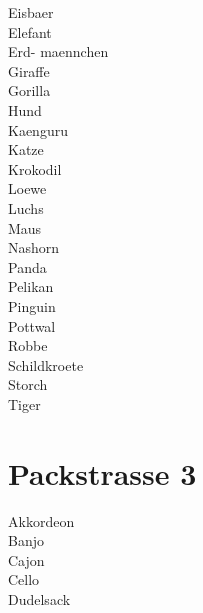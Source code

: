 \documentclass{article}
\begin{document}
Eisbaer
\\


Elefant
\\


Erd-
maennchen
\\


Giraffe
\\


Gorilla
\\


Hund
\\


Kaenguru
\\


Katze
\\


Krokodil
\\


Loewe
\\


Luchs
\\


Maus
\\


Nashorn
\\


Panda
\\


Pelikan
\\


Pinguin
\\


Pottwal
\\


Robbe
\\


Schildkroete
\\


Storch
\\


Tiger
\\

\newpage
\section{Packstrasse 3}


Akkordeon
\\


Banjo
\\


Cajon
\\


Cello
\\


Dudelsack
\\
\end{document}
